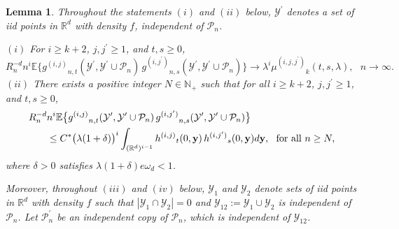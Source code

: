 \documentclass[11pt]{amsart}
\numberwithin{equation}{section}
\theoremstyle{plain}
\newtheorem{lemma}[theorem]{Lemma}
\theoremstyle{definition}
\begin{document}
\begin{lemma} \label{l:conv.upper.lemma}
Throughout the statements $(i)$ and $(ii)$ below, ${{\mathcal{Y}^{\prime}}}$ denotes a set of iid points in ${{\mathbb R}}^d$ with density $f$, independent of ${\mathcal P_n}$.

\noindent $(i)$ For $i \geq k+2$, $j, {j^{\prime}} \geq 1$, and $t,s \geq 0$,
$$
R_n^{-d} n^i {\mathbb{E}} \bigl\{ {g^{(i,j)}}_{n,t}({{\mathcal{Y}^{\prime}}}, {{\mathcal{Y}^{\prime}}} \cup {\mathcal P_n})\, {g^{(i,j^{\prime})}}_{n,s}({{\mathcal{Y}^{\prime}}}, {{\mathcal{Y}^{\prime}}} \cup {\mathcal P_n}) \bigr\} \to \lambda^i {\mu^{(i,j,{j^{\prime}})}}_k(t,s,\lambda), \ \ \ n \to\infty.
$$
\noindent $(ii)$ There exists a positive integer $N \in {{\mathbb N}}_+$ such that for all $i \geq k+2$, $j, {j^{\prime}} \geq 1$, and $t,s\geq 0$,
\begin{align*}
R_n^{-d} &n^i {\mathbb{E}} \bigl\{ {g^{(i,j)}}_{n,t}({{\mathcal{Y}^{\prime}}}, {{\mathcal{Y}^{\prime}}} \cup {\mathcal P_n})\, {g^{(i,j^{\prime})}}_{n,s}({{\mathcal{Y}^{\prime}}}, {{\mathcal{Y}^{\prime}}} \cup {\mathcal P_n}) \bigr\} \\
&\leq C^* \bigl( \lambda(1+\delta) \bigr)^i \int_{({{\mathbb R}}^d)^{i-1}} {h^{(i,j)}}_t(0,{{\bf y}})\, {h^{(i,{j^{\prime}})}}_s(0,{{\bf y}}) d{{\bf y}}, \ \ \text{for all } n \geq N,
\end{align*}
where $\delta>0$ satisfies $\lambda (1+\delta) e\omega_d < 1$.
\vspace{5pt}

Moreover, throughout $(iii)$ and $(iv)$ below, ${{\mathcal{Y}}}_1$ and ${{\mathcal{Y}}}_2$ denote sets of iid points in ${{\mathbb R}}^d$ with density $f$ such that $|{{\mathcal{Y}}}_1 \cap {{\mathcal{Y}}}_2| = 0$ and ${{\mathcal{Y}}}_{12} := {{\mathcal{Y}}}_1 \cup {{\mathcal{Y}}}_2$ is independent of ${\mathcal P_n}$. Let ${\mathcal P_n^{\prime}}$ be an independent copy of ${\mathcal P_n}$, which is independent of ${{\mathcal{Y}}}_{12}$.


\end{lemma}
\end{document}
